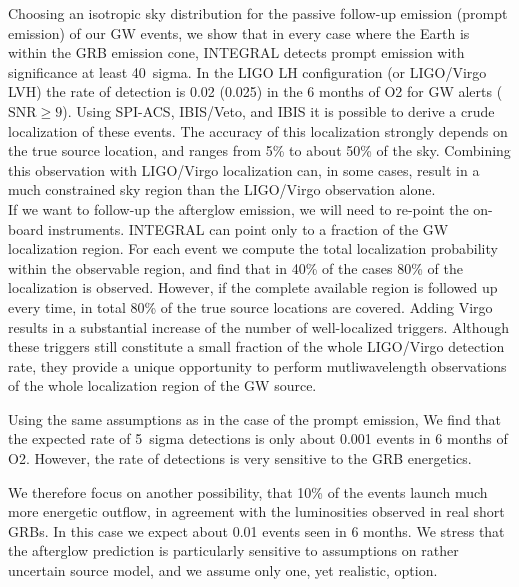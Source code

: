 \documentclass[11pt]{article}
\begin{document}

Choosing an isotropic sky distribution for the passive follow-up
emission (prompt emission) of our GW events, we show that in every
case where the Earth is within the GRB emission cone, INTEGRAL detects
prompt emission with significance at least 40~sigma. In the LIGO LH
configuration (or LIGO/Virgo LVH) the rate of detection is 0.02
(0.025) in the 6 months of O2 for GW alerts ($\mathrm{SNR} \geq
9$). Using SPI-ACS, IBIS/Veto, and IBIS it is possible to derive a
crude localization of these events. The accuracy of this localization
strongly depends on the true source location, and ranges from 5\% to
about 50\% of the sky. Combining this observation with LIGO/Virgo
localization can, in some cases, result in a much constrained sky
region than the LIGO/Virgo observation alone. \\


If we want to follow-up the afterglow emission, we will need to
re-point the on-board instruments. INTEGRAL can point only to a
fraction of the GW localization region. For each event we compute the
total localization probability within the observable region, and find
that in 40\% of the cases 80\% of the localization is
observed. However, if the complete available region is followed up
every time, in total 80\% of the true source locations are
covered. Adding Virgo results in a substantial increase of the number
of well-localized triggers. Although these triggers still constitute a
small fraction of the whole LIGO/Virgo detection rate, they provide a
unique opportunity to perform mutliwavelength observations of the
whole localization region of the GW source.

Using the same assumptions as in the case of the prompt emission, We find that
the expected rate of 5~sigma detections is only about 0.001 events in 6 months
of O2. However, the rate of detections is very sensitive to the GRB energetics.

We therefore focus on another possibility, that 10\% of the events launch much
more energetic outflow, in agreement with the luminosities observed in real
short GRBs. In this case we expect about 0.01 events seen in 6 months. We
stress that the afterglow prediction is particularly sensitive to assumptions on
rather uncertain source model, and we assume only one, yet realistic, option.
\end{document}
